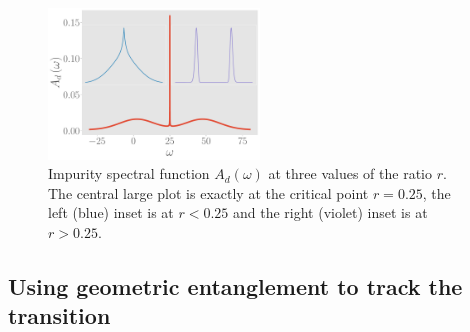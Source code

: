 \documentclass[reprint,superscriptaddress,floatfix]{revtex4-2}
\begin{document}
\begin{figure}[!htb]
	\centering
	\includegraphics[width=0.5\textwidth]{../figures/Add.pdf}
	\caption{Impurity spectral function \(A_d(\omega)\) at three values of the ratio \(r\). The central large plot is exactly at the critical point \(r=0.25\), the left (blue) inset is at \(r < 0.25\) and the right (violet) inset is at \(r > 0.25\).}
	\label{spec-func}
\end{figure}

\subsection{Using geometric entanglement to track the transition}
\end{document}
